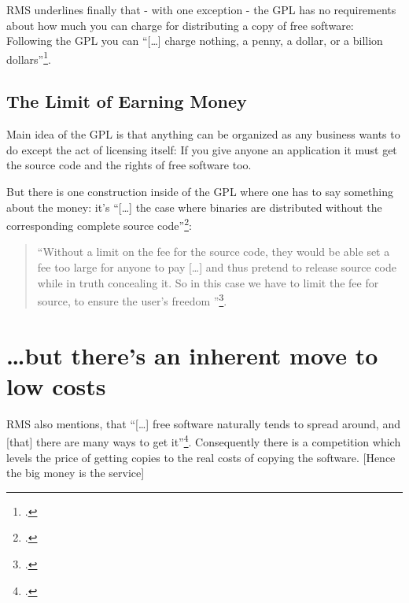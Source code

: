 \documentclass[DIV=calc,BCOR=5mm,11pt,headings=small,oneside,abstract=true, toc=bib]{scrartcl}
\begin{document}
RMS underlines finally that - with one exception - the GPL has no requirements
about how much you can charge for distributing a copy of free software: Following the GPL
you can \enquote{[\ldots] charge nothing, a penny, a dollar, or a billion
dollars}\footcite[cf][64]{Stallman1996b}.

\subsection{The Limit of Earning Money}

Main idea of the GPL is that anything can be organized as any business wants to
do except the act of licensing itself: If you give anyone an application it must
get the source code and the rights of free software too.

But there is one construction inside of the GPL where one has to say something
about the money: it's \enquote{[\ldots] the case where binaries are
distributed without the corresponding complete source
code}\footcite[cf][65]{Stallman1996b}: 

\begin{quote}
\enquote{Without a limit on the fee for the source code, they would be able set a
fee too large for anyone to pay [\ldots] and thus pretend to release source code
while in truth concealing it. So in this case we have to limit the fee for
source, to ensure the user's freedom
}\footcite[][65]{Stallman1996b}.
\end{quote}


\section{\ldots but there's an inherent move to low costs}

RMS also mentions, that \enquote{[\ldots] free software naturally tends to
spread around, and [that] there are many ways to get
it}\footcite[cf][63]{Stallman1996b}. Consequently there is a competition
which levels the price of getting copies to the real costs of copying the
software. [Hence the big money is the service]



\small

\end{document}
